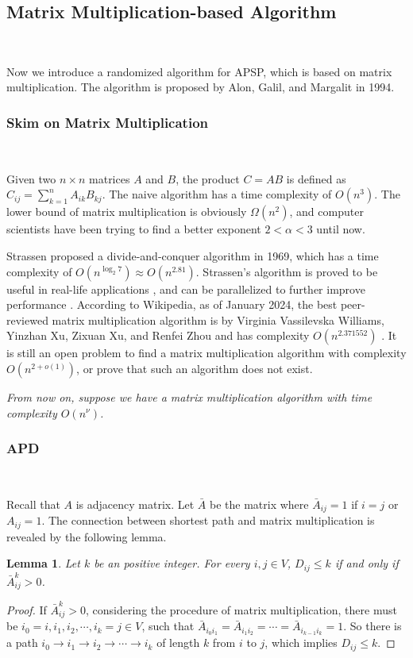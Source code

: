 \documentclass[12pt]{article}
\theoremstyle{plain}
\newtheorem{lemma}{Lemma}[section]
\begin{document}
\subsection{Matrix Multiplication-based Algorithm}\

Now we introduce a randomized algorithm for APSP, which is based on matrix multiplication. The algorithm is proposed by Alon, Galil, and Margalit in 1994.

\subsubsection{Skim on Matrix Multiplication}\

Given two $n\times n$ matrices $A$ and $B$, the product $C=AB$ is defined as $C_{ij}=\sum_{k=1}^n A_{ik}B_{kj}$. The naive algorithm has a time complexity of $O(n^3)$. The lower bound of matrix multiplication is obviously $\Omega(n^2)$, and computer scientists have been trying to find a better exponent $2<\alpha<3$ until now.

Strassen proposed a divide-and-conquer algorithm in 1969, which has a time complexity of $O(n^{\log_2 7})\approx O(n^{2.81})$. Strassen's algorithm is proved to be useful in real-life applications \cite{cite-key}, and can be parallelized to further improve performance \cite{CHOU199549}. According to Wikipedia, as of January 2024, the best peer-reviewed matrix multiplication algorithm is by Virginia Vassilevska Williams, Yinzhan Xu, Zixuan Xu, and Renfei Zhou and has complexity $O(n^{2.371552})$ \cite{williams2023newboundsmatrixmultiplication}. It is still an open problem to find a matrix multiplication algorithm with complexity $O(n^{2+o(1)})$, or prove that such an algorithm does not exist.

\emph{From now on, suppose we have a matrix multiplication algorithm with time complexity $O(n^\nu)$.}

\subsubsection{APD}\

Recall that $A$ is adjacency matrix. Let $\bar{A}$ be the matrix where $\bar{A}_{ij}=1$ if $i=j$ or $A_{ij}=1$. The connection between shortest path and matrix multiplication is revealed by the following lemma.
\begin{lemma}
    \label{lemma:shortest_path_matrix_multiplication}
    Let $k$ be an positive integer. For every $i,j\in V$, $D_{ij}\le k$ if and only if $\bar{A}^k_{ij}>0$.
\end{lemma}
\begin{proof}
If $\bar{A}^k_{ij}>0$, considering the procedure of matrix multiplication, there must be $i_0=i,i_1,i_2,\cdots,i_k=j\in V$, such that $\bar A_{i_0i_1}=\bar A_{i_1i_2}=\cdots=\bar A_{i_{k-1}i_k}=1$. So there is a path $i_0\to i_1\to i_2\to\cdots\to i_k$ of length $k$ from $i$ to $j$, which implies $D_{ij}\le k$.
\end{proof}
\end{document}
